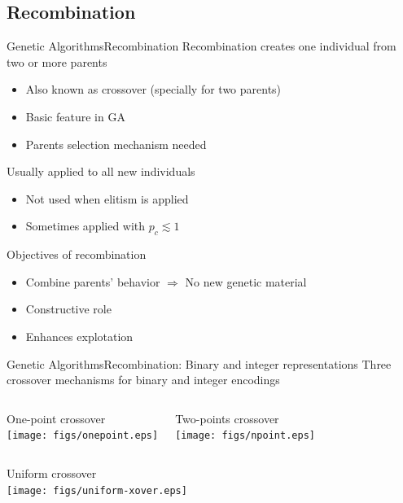 \documentclass[10pt,compress]{beamer} %
\begin{document}
\subsection{Recombination}
\begin{frame}{Genetic Algorithms}{Recombination}
	Recombination creates one individual from two or more parents
	\begin{itemize}
		\item Also known as crossover (specially for two parents)
		\item Basic feature in GA
		\item Parents selection mechanism needed
	\end{itemize}
	Usually applied to all new individuals
	\begin{itemize}
		\item Not used when elitism is applied
		\item Sometimes applied with $p_c \lesssim 1$ 
	\end{itemize}
	Objectives of recombination
	\begin{itemize}
		\item Combine parents' behavior $\Rightarrow$ No new genetic material
		\item Constructive role
		\item Enhances explotation
	\end{itemize}
\end{frame}

\begin{frame}{Genetic Algorithms}{Recombination: Binary and integer representations}
	Three crossover mechanisms for binary and integer encodings
    \begin{columns}
		\begin{center}
		One-point crossover\\
		\texttt{[image: figs/onepoint.eps]}\\
		\end{center}
		\begin{center}
		Two-points crossover\\
		\texttt{[image: figs/npoint.eps]}\\
		\end{center}
	   \end{columns}

	\begin{center}
		\centering Uniform crossover\\
		\texttt{[image: figs/uniform-xover.eps]}
	\end{center}

\end{frame}
\end{document}
